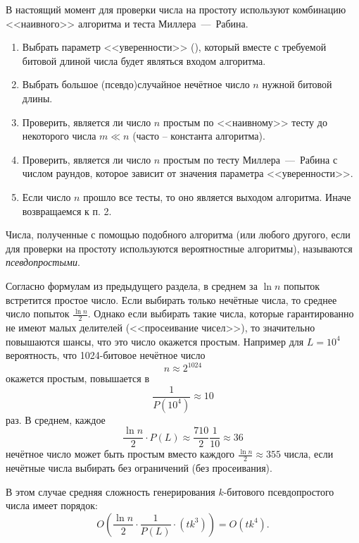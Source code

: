 В настоящий момент для проверки числа на простоту используют комбинацию <<наивного>> алгоритма и теста Миллера~---~Рабина.

\begin{enumerate}
	\item Выбрать параметр <<уверенности>> (), который вместе с требуемой битовой длиной числа будет являться входом алгоритма.
	\item Выбрать большое (псевдо)случайное нечётное число $n$ нужной битовой длины.
	\item Проверить, является ли число $n$ простым по <<наивному>> тесту до некоторого числа $m \ll n$ (часто -- константа алгоритма).
	\item Проверить, является ли число $n$ простым по тесту Миллера~---~Рабина с числом раундов, которое зависит от значения параметра <<уверенности>>.
	\item Если число $n$ прошло все тесты, то оно является выходом алгоритма. Иначе возвращаемся к п. 2.
\end{enumerate}

Числа, полученные с помощью подобного алгоритма (или любого другого, если для проверки на простоту используются вероятностные алгоритмы), называются \emph{псевдопростыми}.

Согласно формулам из предыдущего раздела, в среднем за $\ln n$ попыток встретится простое число. Если выбирать только нечётные числа, то среднее число попыток $\frac{\ln n}{2}$. Однако если выбирать такие числа, которые гарантированно не имеют малых делителей (<<просеивание чисел>>), то значительно повышаются шансы, что это число окажется простым. Например для $L = 10^4$ вероятность, что 1024-битовое нечётное число
    \[ n \approx 2^{1024} \]
окажется простым, повышается в
    \[ \frac{1}{P(10^4)} \approx 10 \]
раз. В среднем, каждое
    \[ \frac{\ln n}{2} \cdot P(L) \approx \frac{710}{2} \frac{1}{10} \approx 36 \]
нечётное число может быть простым вместо каждого $\frac{\ln n}{2} \approx 355$ числа, если нечётные числа выбирать без ограничений (без просеивания).

В этом случае средняя сложность генерирования $k$-битового псевдопростого числа имеет порядок:
    \[ O \left( \frac{\ln n}{2} \cdot \frac{1}{P(L)} \cdot \left( t k^3 \right) \right) = O(t k^4). \]
